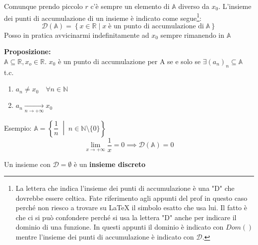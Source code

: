 Comunque prendo piccolo $r$ c'è sempre un elemento di $\mathbb{A}$ diverso da $x_0$. L'insieme dei punti di accumulazione di un insieme è indicato come segue\footnote{La lettera che indica l'insieme dei punti di accumulazione è una "D" che dovrebbe essere celtica. Fate riferimento agli appunti del prof in questo caso perché non riesco a trovare su \LaTeX\; il simbolo esatto che usa lui. Il fatto è che ci si può confondere perché si usa la lettera "D" anche per indicare il dominio di una funzione. In questi appunti il dominio è indicato con $Dom()$ mentre l'insieme dei punti di accumulazione è indicato con $\mathcal{D}$.}:
\begin{equation*}
	\mathcal{D} (\mathbb{A}) = \left\{ x \in \mathbb{R}\; |\; x\; \text{è un punto di accumulazione di}\; \mathbb{A} \right\}
\end{equation*}
Posso in pratica avvicinarmi indefinitamente ad $x_0$ sempre rimanendo in $\mathbb{A}$

\textbf{Proposizione:}\\
$\mathbb{A} \subseteq \mathbb{R}, x_o \in \mathbb{R}$. $x_0$ è un punto di accumulazione per A se e solo se $\exists (a_n)_n \subseteq \mathbb{A}$ t.c.
\begin{enumerate}
	\item $a_n \neq x_0 \quad \forall n \in \mathbb{N}$
	\item $a_n \xrightarrow[n\to +\infty]{} x_0$
\end{enumerate}
Esempio:
$\mathbb{A} = \left\{\dfrac{1}{n} \;\middle|\; n \in \mathbb{N} \setminus \{0\} \right\}$
\begin{equation*}
    \lim_{x\to + \infty} \dfrac{1}{x} = 0 \implies \mathcal{D}(\mathbb{A}) = {0}
\end{equation*}

Un insieme con $\mathcal{D} = \emptyset $ è un \textbf{insieme discreto}

